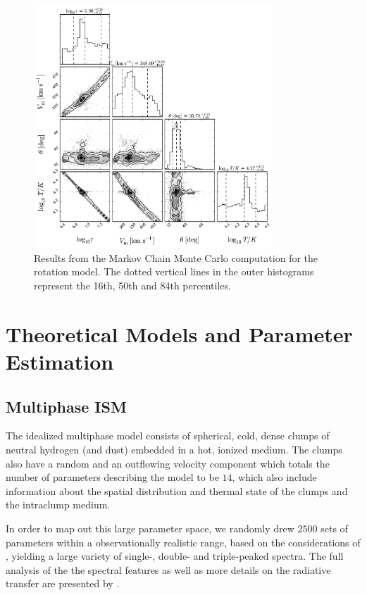 \documentclass[a4,useAMS,usenatbib,usegraphicx]{mn2e}
\begin{document}
\begin{figure}
\begin{center}
\includegraphics[width=0.8\textwidth]{emcee_results.pdf}
\caption{Results from the Markov Chain Monte Carlo computation for
    the rotation model. The dotted vertical lines in the outer histograms 
	represent the 16th, 50th and 84th percentiles. \label{emceeresults}} 
\end{center}
\end{figure}


\section{Theoretical Models and Parameter Estimation}


\subsection{Multiphase ISM} 

The idealized multiphase model consists of spherical, cold, dense
clumps of neutral hydrogen (and dust) embedded in a hot, ionized
medium. 
The clumps also have a random and an outflowing velocity
component which totals the number of parameters describing the model
to be $14$, which also include information about the spatial
distribution and thermal state of the clumps and the intraclump
medium. 

In order to map out this large parameter space, we randomly drew
$2500$ sets of parameters within a observationally realistic range,
based on the considerations of \citet{Laursen2013ApJ...766..124L}, 
yielding a large variety of single-, double- and triple-peaked
spectra. 
The full analysis of the the spectral features as well as
more details on the radiative transfer are presented by
\citet{Gronke2016}.    
\end{document}

